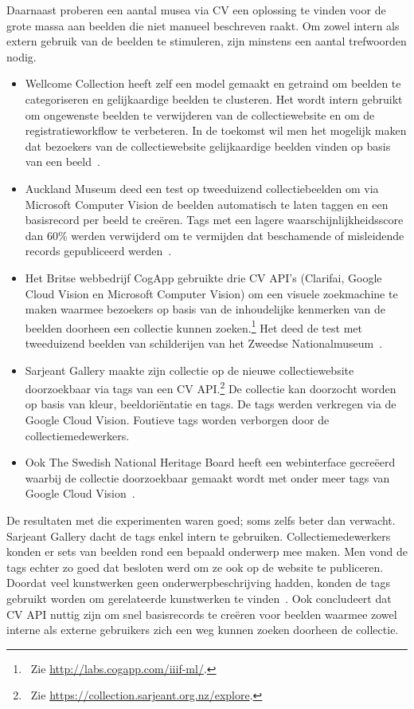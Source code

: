 Daarnaast proberen een aantal musea via CV een oplossing te vinden voor de grote massa aan beelden die niet manueel beschreven raakt. Om zowel intern als extern gebruik van de beelden te stimuleren, zijn minstens een aantal trefwoorden nodig.
\begin{itemize}
	\item Wellcome Collection heeft zelf een model gemaakt en getraind om beelden te categoriseren en gelijkaardige beelden te clusteren. Het wordt intern gebruikt om ongewenste beelden te verwijderen van de collectiewebsite en om de registratieworkflow te verbeteren. In de toekomst wil men het mogelijk maken dat bezoekers van de collectiewebsite gelijkaardige beelden vinden op basis van een beeld~\autocite{Pim2018a}.
	\item Auckland Museum deed een test op tweeduizend collectiebeelden om via Microsoft Computer Vision de beelden automatisch te laten taggen en een basisrecord per beeld te creëren. Tags met een lagere waarschijnlijkheidsscore dan 60\% werden verwijderd om te vermijden dat beschamende of misleidende records gepubliceerd werden~\autocite{Moriarty2018a}.
	\item Het Britse webbedrijf CogApp gebruikte drie CV API’s (Clarifai, Google Cloud Vision en Microsoft Computer Vision) om een visuele zoekmachine te maken waarmee bezoekers op basis van de inhoudelijke kenmerken van de beelden doorheen een collectie kunnen zoeken.\footnote{~Zie \url{http://labs.cogapp.com/iiif-ml/}.} Het deed de test met tweeduizend beelden van schilderijen van het Zweedse Nationalmuseum~\autocite{Hindle2017}.
	\item Sarjeant Gallery maakte zijn collectie op de nieuwe collectiewebsite doorzoekbaar via tags van een CV API.\footnote{~Zie \url{https://collection.sarjeant.org.nz/explore}.} De collectie kan doorzocht worden op basis van kleur, beeldoriëntatie en tags. De tags werden verkregen via de Google Cloud Vision. Foutieve tags worden verborgen door de collectiemedewerkers.~\autocite{Rowe2017} 
	\item Ook The Swedish National Heritage Board heeft een webinterface gecreëerd waarbij de collectie doorzoekbaar gemaakt wordt met onder meer tags van Google Cloud Vision~\autocite{Haskiya2019}.
\end{itemize} 

De resultaten met die experimenten waren goed; soms zelfs beter dan verwacht. Sarjeant Gallery dacht de tags enkel intern te gebruiken. Collectiemedewerkers konden er sets van beelden rond een bepaald onderwerp mee maken. Men vond de tags echter zo goed dat besloten werd om ze ook op de website te publiceren. Doordat veel kunstwerken geen onderwerpbeschrijving hadden, konden de tags gebruikt worden om gerelateerde kunstwerken te vinden~\autocite{Rowe2017}. Ook \textcite{Moriarty2018a} concludeert dat CV API nuttig zijn om snel basisrecords te creëren voor beelden waarmee zowel interne als externe gebruikers zich een weg kunnen zoeken doorheen de collectie. 

